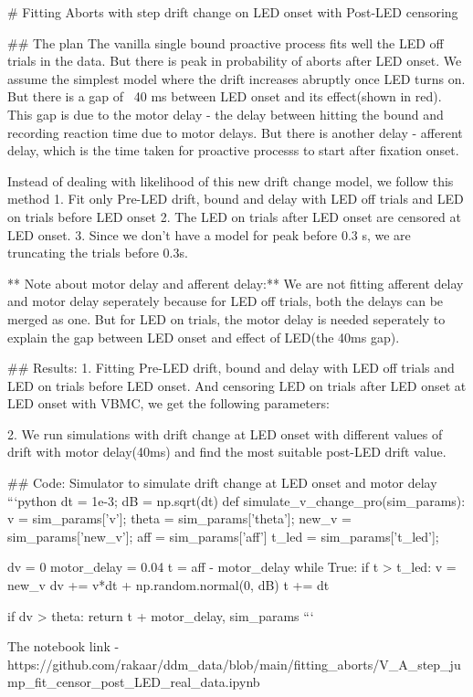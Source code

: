 # Fitting Aborts with step drift change on LED onset with Post-LED censoring

## The plan
The vanilla single bound proactive process fits well the LED off trials in the data. But there is peak in probability of aborts after LED onset.
We assume the simplest model where the drift increases abruptly once LED turns on. But there is a gap of ~40 ms between LED onset and its effect(shown in red).
This gap is due to the motor delay - the delay between hitting the bound and recording reaction time due to motor delays.
But there is another delay - afferent delay, which is the time taken for proactive processs to start after fixation onset.



Instead of dealing with likelihood of this new drift change model, we follow this method
1. Fit only Pre-LED drift, bound and delay with LED off trials and LED on trials before LED onset
2. The LED on trials after LED onset are censored at LED onset.
3. Since we don't have a model for peak before 0.3 s, we are truncating the trials before 0.3s.

** Note about motor delay and afferent delay:**
We are not fitting afferent delay and motor delay seperately because for LED off trials, both the delays
can be merged as one. But for LED on trials, the motor delay is needed seperately to explain the gap between
LED onset and effect of LED(the 40ms gap). 

## Results:
1. Fitting Pre-LED drift, bound and delay with LED off trials and LED on trials before LED onset. 
And censoring LED on trials after LED onset at LED onset with VBMC, we get the following parameters:

2. We run simulations with drift change at LED onset with different values of drift with motor delay(40ms) 
and find the most suitable post-LED drift value.



## Code:
Simulator to simulate drift change at LED onset and motor delay
```python
dt = 1e-3; dB = np.sqrt(dt)
def simulate_v_change_pro(sim_params):
    v = sim_params['v']; theta = sim_params['theta']; new_v = sim_params['new_v']; aff = sim_params['aff'] 
    t_led = sim_params['t_led'];
    
    dv = 0
    motor_delay = 0.04 
    t = aff - motor_delay      
    while True:
        if t > t_led:
            v = new_v
        dv += v*dt + np.random.normal(0, dB)
        t += dt

        if dv > theta:
            return t + motor_delay, sim_params
```

The notebook link - https://github.com/rakaar/ddm_data/blob/main/fitting_aborts/V_A_step_jump_fit_censor_post_LED_real_data.ipynb

